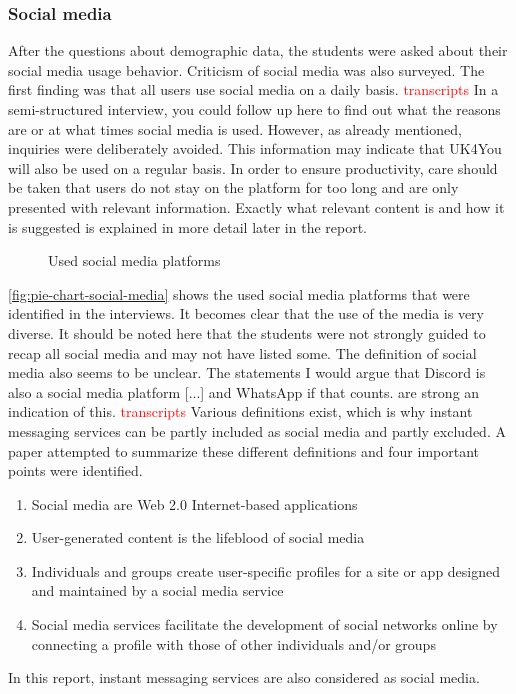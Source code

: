 \subsubsection{Social media}
After the questions about demographic data, the students were asked about their social media usage behavior.
Criticism of social media was also surveyed.
The first finding was that all users use social media on a daily basis. \textcolor{red}{transcripts}
In a semi-structured interview, you could follow up here to find out what the reasons are or at what times social media is used.
However, as already mentioned, inquiries were deliberately avoided.
This information may indicate that UK4You will also be used on a regular basis.
In order to ensure productivity, care should be taken that users do not stay on the platform for too long and are only presented with relevant information.
Exactly what relevant content is and how it is suggested is explained in more detail later in the report.\\

\begin{figure}[ht]
    \centering
    \caption{Used social media platforms}
    \label{fig:pie-chart-social-media}
\end{figure}

\autoref{fig:pie-chart-social-media} shows the used social media platforms that were identified in the interviews.
It becomes clear that the use of the media is very diverse.
It should be noted here that the students were not strongly guided to recap all social media and may not have listed some.
The definition of social media also seems to be unclear.
The statements \glqq I would argue that Discord is also a social media platform [...]\grqq{} and \glqq [...] WhatsApp if that counts.\grqq{} are strong an indication of this. \textcolor{red}{transcripts}
Various definitions exist, which is why instant messaging services can be partly included as social media and partly excluded.
A paper attempted to summarize these different definitions and four important points were identified\cite{social-media-definition}.
\begin{enumerate}
    \item Social media are Web 2.0 Internet-based applications
    \item User-generated content is the lifeblood of social media
    \item Individuals and groups create user-specific profiles for a site or app designed and maintained by a social media service
    \item Social media services facilitate the development of social networks online by connecting a profile with those of other individuals and/or groups
\end{enumerate}
In this report, instant messaging services are also considered as social media.\\

